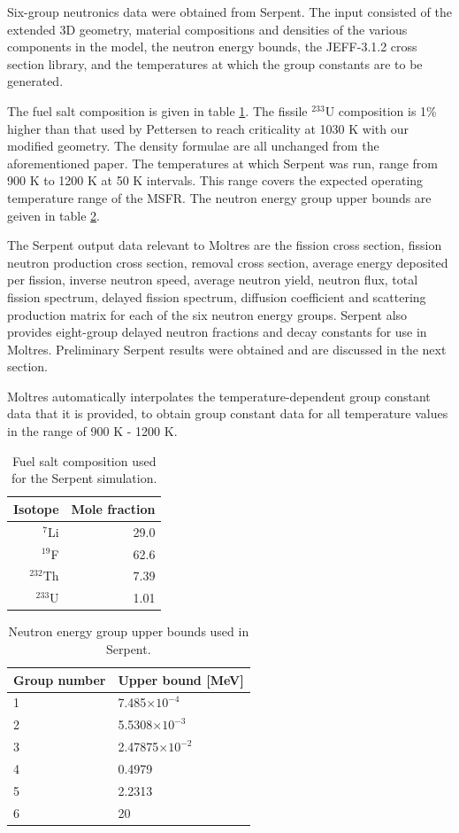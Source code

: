 \documentclass{anstrans}
\begin{document}
Six-group neutronics data were obtained from Serpent. The input consisted of the extended 3D geometry, material compositions and densities of the various components in the model, the neutron energy bounds, the JEFF-3.1.2 cross section library, and the temperatures at which the group constants are to be generated.

The fuel salt composition is given in table \ref{table:fuelsalt}. The fissile $^{233}$U composition is 1\% higher than that used by Pettersen \cite{pettersen_coupled_2016} to reach criticality at 1030 K with our modified geometry. The density formulae are all unchanged from the aforementioned paper. The temperatures at which Serpent was run, range from 900 K to 1200 K at 50 K intervals. This range covers the expected operating temperature range of the MSFR. The neutron energy group upper bounds are geiven in table \ref{table:bound}.

The Serpent output data relevant to Moltres are the fission cross section, fission neutron production cross section, removal cross section, average energy deposited per fission, inverse neutron speed, average neutron yield, neutron flux, total fission spectrum, delayed fission spectrum, diffusion coefficient and scattering production matrix for each of the six neutron energy groups. Serpent also provides eight-group delayed neutron fractions and decay constants for use in Moltres. Preliminary Serpent results were obtained and are discussed in the next section.

Moltres automatically interpolates the temperature-dependent group constant data that it is provided, to obtain group constant data for all temperature values in the range of 900 K - 1200 K. 
%
\begin{table}[h]
\centering
\begin{tabular}{rr}
{Isotope} & {Mole fraction}\\
\hline
$^7$Li & 29.0\\
$^{19}$F & 62.6\\
$^{232}$Th & 7.39\\
$^{233}$U & 1.01
\end{tabular}
\captionsetup{justification=centering}
\caption{Fuel salt composition used for the Serpent simulation.}
\label{table:fuelsalt}
\end{table}
%
\begin{table}[h]
\centering
\begin{tabular}{ll}
{Group number} & {Upper bound [MeV]}\\
\hline
1 & 7.485$\times 10^{-4}$\\
2 & 5.5308$\times 10^{-3}$\\
3 & 2.47875$\times 10^{-2}$\\
4 & 0.4979\\
5 & 2.2313\\
6 & 20
\end{tabular}
\captionsetup{justification=centering}
\caption{Neutron energy group upper bounds used in Serpent.}
\label{table:bound}
\end{table}
\end{document}
